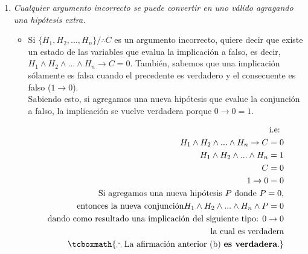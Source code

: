 \documentclass[11pt,letterpaper]{article}
\begin{document}
\begin{enumerate}
\begin{enumerate}
                \item \textit{Cualquier argumento incorrecto se puede convertir en uno válido agragando
                una hipótesis extra.}

                    \begin{itemize}
                        \item Si $\{H_1,H_2,...,H_n\}/\therefore C$ es un argumento incorrecto, quiere
                        decir que existe un estado de las variables que evalua la implicación a falso,
                        es decir, $H_1 \land H_2 \land ... \land H_n \rightarrow C = 0$. También, sabemos
                        que una implicación sólamente es falsa cuando el precedente es verdadero y el
                        consecuente es falso ($1 \rightarrow 0$). \\ Sabiendo esto, si agregamos una nueva
                        hipótesis que evalue la conjunción a falso, la implicación se vuelve verdadera
                        porque $ 0 \rightarrow 0 = 1$.

                        \begin{equation*} \begin{split}
                            \text{i.e: } \\
                            H_1 \land H_2 \land ... \land H_n \rightarrow C = 0 \\
                            H_1 \land H_2 \land ... \land H_n = 1 \\
                            C = 0 \\
                            1 \rightarrow 0  = 0 \\
                            \text{Si agregamos una nueva hipótesis } P \text{ donde $P = 0$,} \\
                            \text{entonces la nueva conjunción} H_1 \land H_2 \land ... \land H_n \land P = 0 \\
                            \text{dando como resultado una implicación del siguiente tipo: } 0 \rightarrow 0 \\
                            \text{la cual es verdadera} \\
                            \tcboxmath{\therefore \text{La afirmación anterior (b) \textbf{es verdadera}.}}
                        \end{split} \end{equation*}
                    \end{itemize}

            \end{enumerate}
\end{enumerate}
\end{document}
